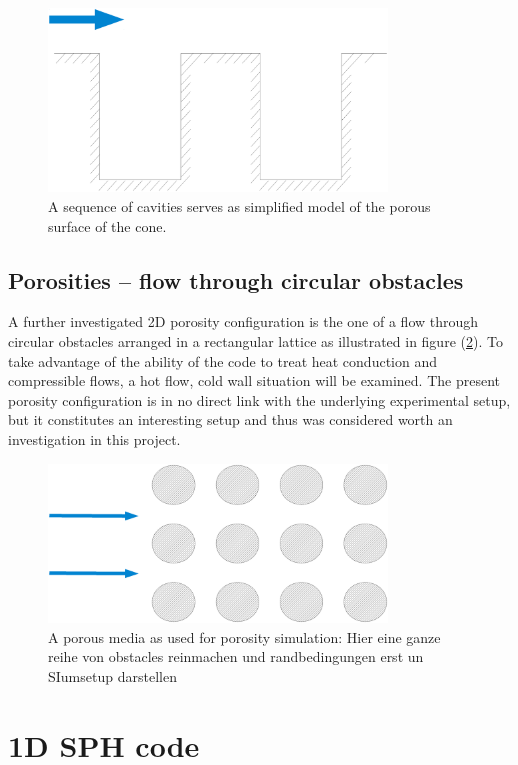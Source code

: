 \documentclass[11pt,a4paper,twoside]{report}
\begin{document}
\begin{figure}[!htbp]
  \centering
     \includegraphics[width=9cm]{Graphics/TestCases_genIntro/Cavity}
  \caption{A sequence of cavities serves as simplified model of the porous surface of the cone.}
  \label{fig:PorositiesSequenceOfCavities}
\end{figure}


\subsection{Porosities -- flow through circular obstacles}
\label{sec:PorositiesCircularObstacles}
A further investigated 2D porosity configuration is the one of a flow through circular obstacles arranged in a rectangular lattice as illustrated in figure (\ref{fig:PorositiesCircularObstacles}). To take advantage of the ability of the code to treat heat conduction and compressible flows, a hot flow, cold wall situation will be examined. The present porosity configuration is in no direct link with the underlying experimental setup, but it constitutes an interesting setup and thus was considered worth an investigation in this project. 

\begin{figure}[!htbp]
  \centering
     \includegraphics[width=9cm]{Graphics/TestCases_genIntro/Porosities}
  \caption{A porous media as used for porosity simulation: Hier eine ganze reihe von obstacles reinmachen und randbedingungen erst un SIumsetup darstellen }
  \label{fig:PorositiesCircularObstacles}
\end{figure}


\section{1D SPH code}
\label{sec:1DSPHcode}
\end{document}
